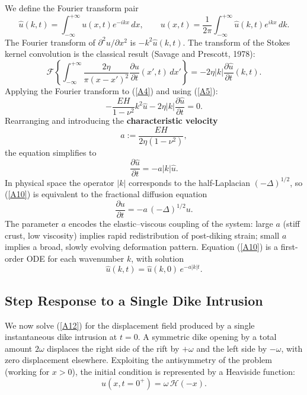 \documentclass{article}
\begin{document}
We define the Fourier transform pair
\begin{equation*}
\hat{u}(k,t) = \int_{-\infty}^{+\infty}u(x,t)e^{-ikx}\,dx,\qquad
u(x,t) = \frac{1}{2\pi}\int_{-\infty}^{+\infty}\hat{u}(k,t)e^{ikx}\,dk.
\end{equation*}
The Fourier transform of $\partial^2 u/\partial x^2$ is $-k^2\hat{u}(k,t)$.
The transform of the Stokes kernel convolution is the classical result
(Savage and Prescott, 1978):
\begin{equation}
\mathcal{F}\!\left\{
  \int_{-\infty}^{+\infty}\frac{2\eta}{\pi(x-x')^2}
  \frac{\partial u}{\partial t}(x',t)\,dx'
\right\} = -2\eta|k|\frac{\partial\hat{u}}{\partial t}(k,t).
\label{A5}
\end{equation}
Applying the Fourier transform to (\ref{A4}) and using (\ref{A5}):
\begin{equation}
-\frac{EH}{1-\nu^2}k^2\hat{u} - 2\eta|k|\frac{\partial\hat{u}}{\partial t}=0.
\label{A6}
\end{equation}
Rearranging and introducing the \textbf{characteristic velocity}
\begin{equation}
\boxed{a := \frac{EH}{2\eta(1-\nu^2)}},
\label{A9}
\end{equation}
the equation simplifies to
\begin{equation}
\frac{\partial\hat{u}}{\partial t} = -a|k|\hat{u}.
\label{A10}
\end{equation}
In physical space the operator $|k|$ corresponds to the half-Laplacian
$(-\Delta)^{1/2}$, so (\ref{A10}) is equivalent to the fractional diffusion
equation
\begin{equation}
\frac{\partial u}{\partial t} = -a\,(-\Delta)^{1/2}u.
\label{A11}
\end{equation}
The parameter $a$ encodes the elastic--viscous coupling of the system: large
$a$ (stiff crust, low viscosity) implies rapid redistribution of post-diking
strain; small $a$ implies a broad, slowly evolving deformation pattern.
Equation (\ref{A10}) is a first-order ODE for each wavenumber $k$, with
solution
\begin{equation}
\hat{u}(k,t) = \hat{u}(k,0)\,e^{-a|k|t}.
\label{A12}
\end{equation}

\subsection{Step Response to a Single Dike Intrusion}
\label{sec:step}

We now solve (\ref{A12}) for the displacement field produced by a single
instantaneous dike intrusion at $t=0$. A symmetric dike opening by a total
amount $2\omega$ displaces the right side of the rift by $+\omega$ and the
left side by $-\omega$, with zero displacement elsewhere. Exploiting the
antisymmetry of the problem (working for $x>0$), the initial condition is
represented by a Heaviside function:
\begin{equation}
u(x,t=0^+) = \omega\,\mathcal{H}(-x).
\label{A13}
\end{equation}
\end{document}
